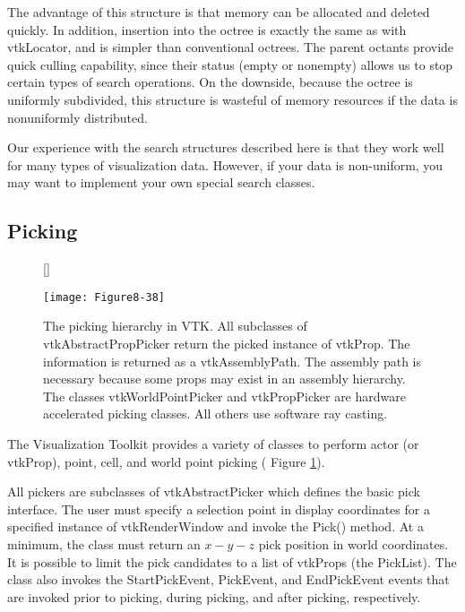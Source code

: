 The advantage of this structure is that memory can be allocated and deleted quickly. In addition, insertion into the octree is exactly the same as with vtkLocator, and is simpler than conventional octrees. The parent octants provide quick culling capability, since their status (empty or nonempty) allows us to stop certain types of search operations. On the downside, because the octree is uniformly subdivided, this structure is wasteful of memory resources if the data is nonuniformly distributed.

Our experience with the search structures described here is that they work well for many types of visualization data. However, if your data is non-uniform, you may want to implement your own special search classes.


\subsection{Picking}
\label{subsec:picking}

\begin{figure}[!htb]
	[\FBwidth]
	{\caption{The picking hierarchy in VTK. All subclasses of vtkAbstractPropPicker return the picked instance of vtkProp. The information is returned as a vtkAssemblyPath. The assembly path is necessary because some props may exist in an assembly hierarchy. The classes vtkWorldPointPicker and vtkPropPicker are hardware accelerated picking classes. All others use software ray casting.}\label{fig:Figure8-38}}
	{\texttt{[image: Figure8-38]}}
\end{figure}


The Visualization Toolkit provides a variety of classes to perform actor (or vtkProp), point, cell, and world point picking ( Figure \ref{fig:Figure8-38}).

All pickers are subclasses of vtkAbstractPicker which defines the basic pick interface. The user must specify a selection point in display coordinates for a specified instance of vtkRenderWindow and invoke the Pick() method. At a minimum, the class must return an $x-y-z$ pick position in world coordinates. It is possible to limit the pick candidates to a list of vtkProps (the PickList). The class also invokes the StartPickEvent, PickEvent, and EndPickEvent events that are invoked prior to picking, during picking, and after picking, respectively.

